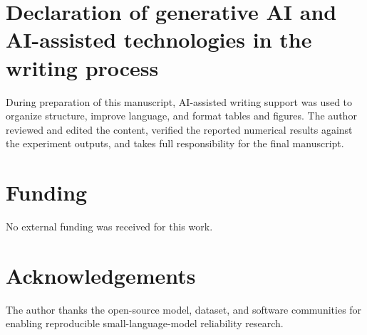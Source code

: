 \documentclass[preprint,12pt,authoryear]{elsarticle}
\begin{document}
\section*{Declaration of generative AI and AI-assisted technologies in the writing process}
During preparation of this manuscript, AI-assisted writing support was used to organize structure, improve language, and format tables and figures. The author reviewed and edited the content, verified the reported numerical results against the experiment outputs, and takes full responsibility for the final manuscript.

\section*{Funding}
No external funding was received for this work.

\section*{Acknowledgements}
The author thanks the open-source model, dataset, and software communities for enabling reproducible small-language-model reliability research.
\end{document}
